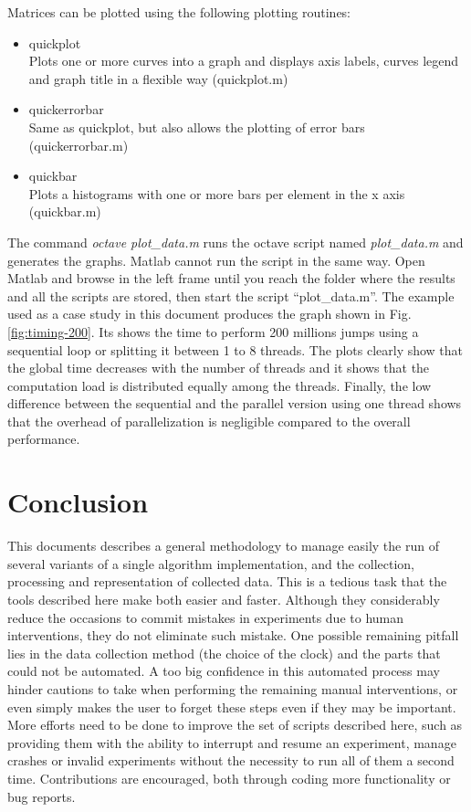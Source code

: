 Matrices can be plotted using the following plotting routines:
\begin{itemize}
\item quickplot\\
Plots one or more curves into a graph and displays axis labels, curves legend and graph title in a flexible way (quickplot.m)
\item quickerrorbar\\
Same as quickplot, but also allows the plotting of error bars (quickerrorbar.m)
\item quickbar\\
Plots a histograms with one or more bars per element in the x axis (quickbar.m)
\end{itemize}

The command \emph{octave plot\_data.m} runs the octave script named \emph{plot\_data.m} and generates the graphs. Matlab cannot run the script in the same way. Open Matlab and browse in the left frame until you reach the folder where the results and all the scripts are stored, then start the script ``plot\_data.m''. The example used as a case study in this document produces the graph shown in Fig.\ref{fig:timing-200}. Its shows the time to perform 200 millions jumps using a sequential loop or splitting it between 1 to 8 threads. The plots clearly show that the global time decreases with the number of threads and it shows that the computation load is distributed equally among the threads. Finally, the low difference between the sequential and the parallel version using one thread shows that the overhead of parallelization is negligible compared to the overall performance.

\section{Conclusion}
\label{sec:conclusion}
This documents describes a general methodology to manage easily the run of several variants of a single algorithm implementation, and the collection, processing and representation of collected data. This is a tedious task that the tools described here make both easier and faster. Although they considerably reduce the occasions to commit mistakes in experiments due to human interventions, they do not eliminate such mistake. One possible remaining pitfall lies in the data collection method (the choice of the clock) and the parts that could not be automated. A too big confidence in this automated process may hinder cautions to take when performing the remaining manual interventions, or even simply makes the user to forget these steps even if they may be important. More efforts need to be done to improve the set of scripts described here, such as providing them with the ability to interrupt and resume an experiment, manage crashes or invalid experiments without the necessity to run all of them a second time. Contributions are encouraged, both through coding more functionality or bug reports.

